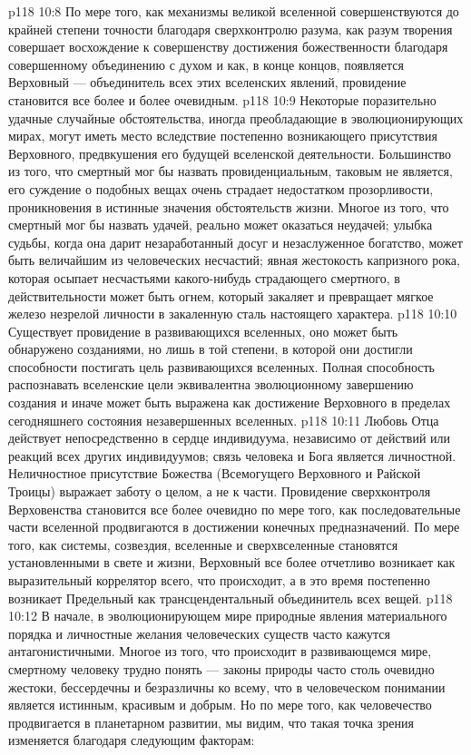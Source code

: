 \vs p118 10:8 По мере того, как механизмы великой вселенной совершенствуются до крайней степени точности благодаря сверхконтролю разума, как разум творения совершает восхождение к совершенству достижения божественности благодаря совершенному объединению с духом и как, в конце концов, появляется Верховный ---  объединитель всех этих вселенских явлений, провидение становится все более и более очевидным.
\vs p118 10:9 Некоторые поразительно удачные случайные обстоятельства, иногда преобладающие в эволюционирующих мирах, могут иметь место вследствие постепенно возникающего присутствия Верховного, предвкушения его будущей вселенской деятельности. Большинство из того, что смертный мог бы назвать провиденциальным, таковым не является, его суждение о подобных вещах очень страдает недостатком прозорливости, проникновения в истинные значения обстоятельств жизни. Многое из того, что смертный мог бы назвать удачей, реально может оказаться неудачей; улыбка судьбы, когда она дарит незаработанный досуг и незаслуженное богатство, может быть величайшим из человеческих несчастий; явная жестокость капризного рока, которая осыпает несчастьями какого\hyp{}нибудь страдающего смертного, в действительности может быть огнем, который закаляет и превращает мягкое железо незрелой личности в закаленную сталь настоящего характера.
\vs p118 10:10 Существует провидение в развивающихся вселенных, оно может быть обнаружено созданиями, но лишь в той степени, в которой они достигли способности постигать цель развивающихся вселенных. Полная способность распознавать вселенские цели эквивалентна эволюционному завершению создания и иначе может быть выражена как достижение Верховного в пределах сегодняшнего состояния незавершенных вселенных.
\vs p118 10:11 Любовь Отца действует непосредственно в сердце индивидуума, независимо от действий или реакций всех других индивидуумов; связь человека и Бога является личностной. Неличностное присутствие Божества (Всемогущего Верховного и Райской Троицы) выражает заботу о целом, а не к части. Провидение сверхконтроля Верховенства становится все более очевидно по мере того, как последовательные части вселенной продвигаются в достижении конечных предназначений. По мере того, как системы, созвездия, вселенные и сверхвселенные становятся установленными в свете и жизни, Верховный все более отчетливо возникает как выразительный коррелятор всего, что происходит, а в это время постепенно возникает Предельный как трансцендентальный объединитель всех вещей.
\vs p118 10:12 \pc В начале, в эволюционирующем мире природные явления материального порядка и личностные желания человеческих существ часто кажутся антагонистичными. Многое из того, что происходит в развивающемся мире, смертному человеку трудно понять --- законы природы часто столь очевидно жестоки, бессердечны и безразличны ко всему, что в человеческом понимании является истинным, красивым и добрым. Но по мере того, как человечество продвигается в планетарном развитии, мы видим, что такая точка зрения изменяется благодаря следующим факторам:
